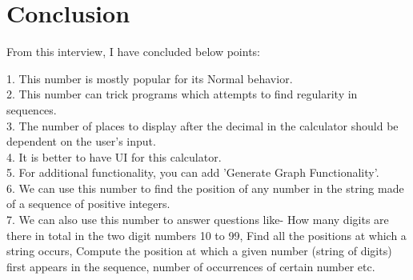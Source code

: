 \documentclass[paper=a4, fontsize=11pt]{scrartcl}
\numberwithin{equation}{section}		%
\numberwithin{figure}{section}			%
\numberwithin{table}{section}				%
\begin{document}
\section*{Conclusion}
\begin{flushleft}
From this interview, I have concluded below points:

1. This number is mostly popular for its Normal behavior.
\\2. This number can trick programs which attempts to find regularity in sequences.
\\3. The number of places to display after the decimal in the calculator should be dependent on the user's input.
\\4. It is better to have UI for this calculator.
\\5. For additional functionality, you can add 'Generate Graph Functionality'.
\\6. We can use this number to find the position of any number in the string made of a sequence of positive integers.
\\7. We can also use this number to answer questions like- How many digits are there in total in the two digit numbers 10 to 99, Find all the positions at which a string occurs, Compute the position at which a given number (string of digits) first appears in the sequence, number of occurrences of certain number etc.

\end{flushleft}


\end{document}
